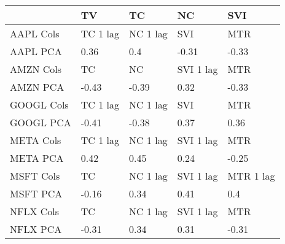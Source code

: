 \begin{tabular}{lllll}
\toprule
{} &        TV &        TC &         NC &        SVI \\
\midrule
AAPL Cols  &  TC 1 lag &  NC 1 lag &        SVI &        MTR \\
AAPL PCA   &      0.36 &       0.4 &      -0.31 &      -0.33 \\
AMZN Cols  &        TC &        NC &  SVI 1 lag &        MTR \\
AMZN PCA   &     -0.43 &     -0.39 &       0.32 &      -0.33 \\
GOOGL Cols &  TC 1 lag &  NC 1 lag &        SVI &        MTR \\
GOOGL PCA  &     -0.41 &     -0.38 &       0.37 &       0.36 \\
META Cols  &  TC 1 lag &  NC 1 lag &  SVI 1 lag &        MTR \\
META PCA   &      0.42 &      0.45 &       0.24 &      -0.25 \\
MSFT Cols  &        TC &  NC 1 lag &  SVI 1 lag &  MTR 1 lag \\
MSFT PCA   &     -0.16 &      0.34 &       0.41 &        0.4 \\
NFLX Cols  &        TC &  NC 1 lag &  SVI 1 lag &        MTR \\
NFLX PCA   &     -0.31 &      0.34 &       0.31 &      -0.31 \\
\bottomrule
\end{tabular}
